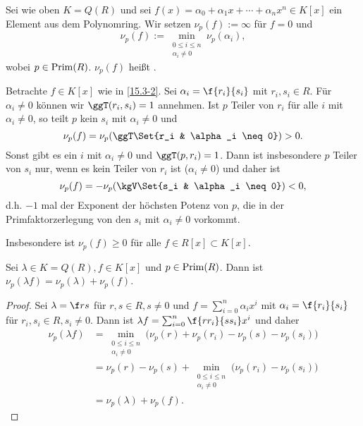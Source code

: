 \begin{df} \label{15.3-2}
	Sei wie oben $K = Q(R)$ und sei $f(x) = \alpha_0 + \alpha_1 x + \dotsb + \alpha_n x^n \in K[x]$	ein Element aus dem Polynomring.
	Wir setzen $\nu_p(f) := \infty$ für $f = 0$ und
	\[
		\nu_p(f) := \min_{\substack{0\le i \le n \\ \alpha_i \neq 0}} \nu_p(\alpha_i),
	\]
	wobei $p \in \operatorname{Prim}(R)$.
	$\nu_p(f)$ heißt .
\end{df}

\begin{nt} \label{15.3-3}
	Betrachte $f \in K[x]$ wie in \ref{15.3-2}.
	Sei $\alpha_i = \f {r_i}{s_i}$ mit $r_i, s_i \in R$.
	Für $\alpha_i \neq 0$ können wir $\ggT(r_i, s_i) = 1$ annehmen.
	Ist $p$ Teiler von $r_i$ für alle $i$ mit $\alpha_i \neq 0$, so teilt $p$ kein $s_i$ mit $\alpha_i \neq 0$ und
	\[
		\nu_p(f) = \nu_p(\ggT \Set{r_i & \alpha_i \neq 0}) > 0.
	\]
	Sonst gibt es ein $i$ mit $\alpha_i \neq 0$ und $\ggT(p, r_i) = 1$.
	Dann ist insbesondere $p$ Teiler von $s_i$ nur, wenn es kein Teiler von $r_i$ ist ($\alpha_i \neq 0$) und daher ist
	\[
		\nu_p(f) = -\nu_p(\kgV \Set{s_i & \alpha_i \neq 0}) < 0,
	\]
	d.h. $-1$ mal der Exponent der höchsten Potenz von $p$, die in der Primfaktorzerlegung von den $s_i$ mit $\alpha_i \neq 0$ vorkommt.

	Insbesondere ist $\nu_p(f) \ge 0$ für alle $f \in R[x] \subset K[x]$.
\end{nt}

\begin{lem} \label{15.3-4}
	Sei $\lambda \in K = Q(R), f \in K[x]$ und $p \in \operatorname{Prim}(R)$.
	Dann ist $\nu_p(\lambda f) = \nu_p(\lambda) + \nu_p(f)$.
	\begin{proof}
		Sei $\lambda = \f rs$ für $r, s \in R, s \neq 0$ und $f = \sum_{i=0}^n \alpha_i x^i$ mit $\alpha_i = \f{r_i}{s_i}$ für $r_i, s_i \in R, s_i \neq 0$.
		Dann ist $\lambda f = \sum_{i=0}^n \f{rr_i}{ss_i} x^i$ und daher
		\begin{align*}
			\nu_p(\lambda f)
			&= \min_{\substack{0\le i \le n \\ \alpha_i \neq 0}} \big( \nu_p(r) + \nu_p(r_i) - \nu_p(s) - \nu_p(s_i) \big) \\
			&= \nu_p(r) - \nu_p(s) + \min_{\substack{0\le i \le n \\ \alpha_i \neq 0}} \big( \nu_p(r_i) - \nu_p(s_i) \big) \\
			&= \nu_p(\lambda) + \nu_p(f).
		\end{align*}
	\end{proof}
\end{lem}

